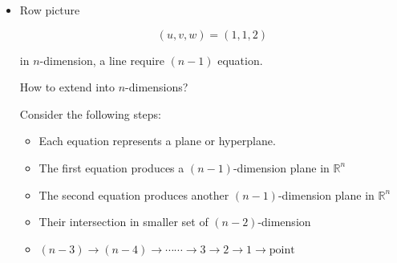 \begin{itemize}
    \item Row picture

\begin{center}    
\end{center}
    \[
    (u, v, w) = (1, 1, 2)
    \]
    \begin{lemma}
        in $n$-dimension, a line require $(n-1)$ equation.
    \end{lemma}

    \begin{exercise}
        How to extend into $n$-dimensions?
    \end{exercise}
    \begin{answer}
    Consider the following steps:
        \begin{itemize}
            \item Each equation represents a plane or hyperplane.
            \item The first equation produces a $(n-1)$-dimension plane in $\mathbb{R}^n$
            \item The second equation produces another $(n-1)$-dimension plane in $\mathbb{R}^n$
            \item Their intersection in smaller set of $(n-2)$-dimension
            \item $(n-3) \rightarrow (n-4) \rightarrow \cdots\cdots \rightarrow 3 \rightarrow 2 \rightarrow 1 \rightarrow \text{point}$
        \end{itemize}


\end{answer}
\end{itemize}
